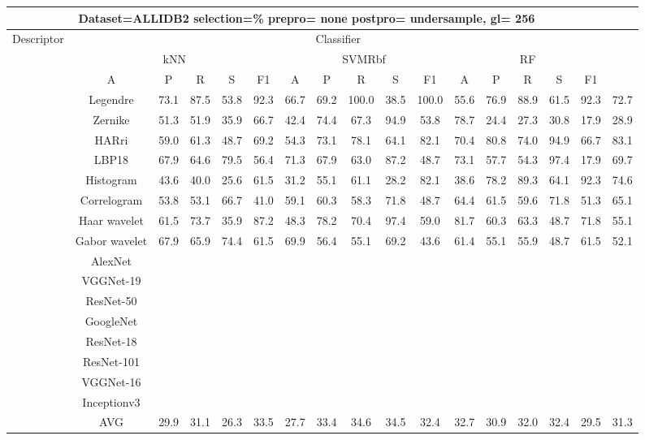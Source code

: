 \documentclass[12pt,italian]{article}
\begin{document}
\begin{tiny}
\begin{longtable}{lcccccccccccccccc}
\toprule
\multicolumn{16}{c}{Dataset=ALLIDB2 selection=\% prepro= none postpro= undersample, gl= 256} \\ 
\toprule
Descriptor & \multicolumn{15}{c}{Classifier} \\ 
& \multicolumn{5}{c}{kNN} & \multicolumn{5}{c}{SVMRbf} & \multicolumn{5}{c}{RF} \\ 
& A & P & R & S & F1 & A & P & R & S & F1 & A & P & R & S & F1 \\ 
\midrule
& Legendre & 73.1 & 87.5 & 53.8 & 92.3 & 66.7 & 69.2 & 100.0 & 38.5 & 100.0 & 55.6 & 76.9 & 88.9 & 61.5 & 92.3 & 72.7 \\ 
& Zernike & 51.3 & 51.9 & 35.9 & 66.7 & 42.4 & 74.4 & 67.3 & 94.9 & 53.8 & 78.7 & 24.4 & 27.3 & 30.8 & 17.9 & 28.9 \\ 
& HARri & 59.0 & 61.3 & 48.7 & 69.2 & 54.3 & 73.1 & 78.1 & 64.1 & 82.1 & 70.4 & 80.8 & 74.0 & 94.9 & 66.7 & 83.1 \\ 
& LBP18 & 67.9 & 64.6 & 79.5 & 56.4 & 71.3 & 67.9 & 63.0 & 87.2 & 48.7 & 73.1 & 57.7 & 54.3 & 97.4 & 17.9 & 69.7 \\ 
& Histogram & 43.6 & 40.0 & 25.6 & 61.5 & 31.2 & 55.1 & 61.1 & 28.2 & 82.1 & 38.6 & 78.2 & 89.3 & 64.1 & 92.3 & 74.6 \\ 
& Correlogram & 53.8 & 53.1 & 66.7 & 41.0 & 59.1 & 60.3 & 58.3 & 71.8 & 48.7 & 64.4 & 61.5 & 59.6 & 71.8 & 51.3 & 65.1 \\ 
& Haar wavelet & 61.5 & 73.7 & 35.9 & 87.2 & 48.3 & 78.2 & 70.4 & 97.4 & 59.0 & 81.7 & 60.3 & 63.3 & 48.7 & 71.8 & 55.1 \\ 
& Gabor wavelet & 67.9 & 65.9 & 74.4 & 61.5 & 69.9 & 56.4 & 55.1 & 69.2 & 43.6 & 61.4 & 55.1 & 55.9 & 48.7 & 61.5 & 52.1 \\ 
& AlexNet \\ 
& VGGNet-19 \\ 
& ResNet-50 \\ 
& GoogleNet \\ 
& ResNet-18 \\ 
& ResNet-101 \\ 
& VGGNet-16 \\ 
& Inceptionv3 \\ 
\hline
& AVG & 29.9 & 31.1 & 26.3 & 33.5 & 27.7 & 33.4 & 34.6 & 34.5 & 32.4 & 32.7 & 30.9 & 32.0 & 32.4 & 29.5 & 31.3 \\ 
\hline
\bottomrule
\end{longtable} 


\end{tiny}
\end{document}
